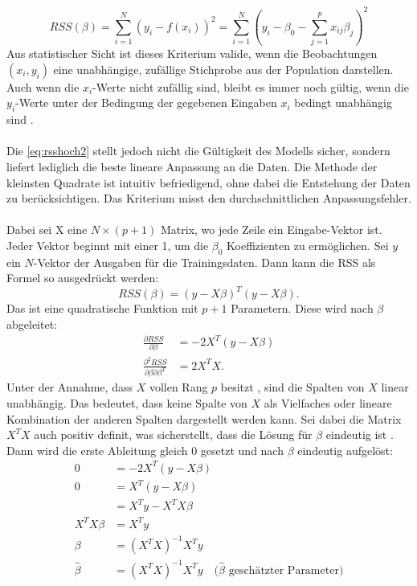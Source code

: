 \begin{equation}
RSS(\beta) = \sum_{i=1}^{N} (y_i - f(x_i))^2 
= \sum_{i=1}^{N} \left( y_i - \beta_0 - \sum_{j=1}^{p} x_{ij} \beta_j \right)^2
\label{eq:rsshoch2}
\end{equation}
Aus statistischer Sicht ist dieses Kriterium valide, wenn die Beobachtungen \( (x_i, y_i) \) eine unabhängige, zufällige Stichprobe aus der Population darstellen. Auch wenn die \(x_i\)-Werte nicht zufällig sind, bleibt es immer noch gültig, wenn die \(y_i\)-Werte unter der Bedingung der gegebenen Eingaben \(x_i\) bedingt unabhängig sind \cite{hastie2009elements}.  \\\\
Die \autoref{eq:rsshoch2} stellt jedoch nicht die Gültigkeit des Modells sicher, sondern liefert lediglich die beste lineare Anpassung an die Daten. Die Methode der kleinsten Quadrate ist intuitiv befriedigend, ohne dabei die Entstehung der Daten zu berücksichtigen. Das Kriterium misst den durchschnittlichen Anpassungsfehler. \\\\
Dabei sei X eine \( N \times (p + 1) \) Matrix, wo jede Zeile ein Eingabe-Vektor ist. Jeder Vektor beginnt mit einer 1, um die $\beta_0$ Koeffizienten zu ermöglichen. Sei \(y\) ein \(N\)-Vektor der Ausgaben für die Trainingsdaten. Dann kann die \ac{RSS} als Formel so ausgedrückt werden: 
\begin{equation}
RSS(\beta) = (y - X\beta)^T (y - X\beta).
\label{eq:RSSmatrix}
\end{equation}
Das ist eine quadratische Funktion mit \(p + 1\) Parametern. Diese wird nach $\beta$ abgeleitet:
\begin{equation}
\begin{aligned}
\frac{\partial RSS}{\partial \beta} &= -2 X^T (y - X\beta) \\
\frac{\partial^2 RSS}{\partial \beta \partial \beta^T} &= 2 X^T X.
\end{aligned}
\label{eq:RSSableitung}
\end{equation}
Unter der Annahme, dass \( X \) vollen Rang \( p \) besitzt \cite{huber1981robust}, sind die Spalten von \( X \) linear unabhängig. Das bedeutet, dass keine Spalte von \( X \) als Vielfaches oder lineare Kombination der anderen Spalten dargestellt werden kann. Sei dabei die Matrix \( X^T X \) auch positiv definit, was sicherstellt, dass die Lösung für \( \beta \) eindeutig ist \cite{hastie2009elements}. Dann wird die erste Ableitung gleich 0 gesetzt und nach $\beta$ eindeutig aufgelöst: 
\begin{equation}
\begin{aligned}
0 &= -2 X^T (y - X\beta) \quad  \\
0 &= X^T (y - X\beta) \quad  \\
  &= X^T y - X^T X \beta \\
X^T X \beta &= X^T y \\
\beta &= (X^T X)^{-1} X^T y \\
\hat{\beta} &= (X^T X)^{-1} X^T y \quad \text{($\hat{\beta}$ geschätzter Parameter)}
\end{aligned}
\label{XTXderived}
\end{equation}
